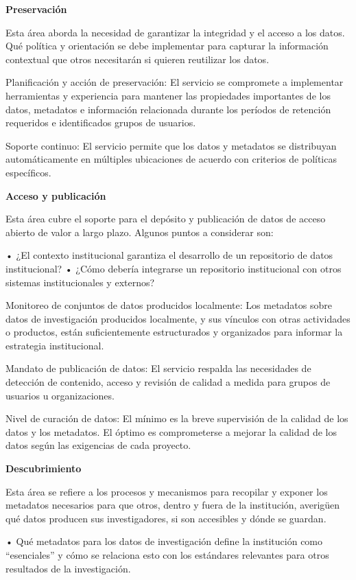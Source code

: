 \documentclass[
  14pt,
]{book}
\begin{document}
\textbf{Preservación}

Esta área aborda la necesidad de garantizar la integridad y el acceso a los datos. Qué política y orientación se debe implementar para capturar la información contextual que otros necesitarán si quieren reutilizar los datos.

Planificación y acción de preservación: El servicio se compromete a implementar herramientas y experiencia para mantener las propiedades importantes de los datos, metadatos e información relacionada durante los períodos de retención requeridos e identificados grupos de usuarios.

Soporte continuo: El servicio permite que los datos y metadatos se distribuyan automáticamente en múltiples ubicaciones de acuerdo con criterios de políticas específicos.

\textbf{Acceso y publicación}

Esta área cubre el soporte para el depósito y publicación de datos de acceso abierto de valor a largo plazo. Algunos puntos a considerar son:

• ¿El contexto institucional garantiza el desarrollo de un repositorio de datos institucional?
• ¿Cómo debería integrarse un repositorio institucional con otros sistemas institucionales y externos?

Monitoreo de conjuntos de datos producidos localmente: Los metadatos sobre datos de investigación producidos localmente, y sus vínculos con otras actividades o productos, están suficientemente estructurados y organizados para informar la estrategia institucional.

Mandato de publicación de datos: El servicio respalda las necesidades de detección de contenido, acceso y revisión de calidad a medida para grupos de usuarios u organizaciones.

Nivel de curación de datos: El mínimo es la breve supervisión de la calidad de los datos y los metadatos. El óptimo es comprometerse a mejorar la calidad de los datos según las exigencias de cada proyecto.

\textbf{Descubrimiento}

Esta área se refiere a los procesos y mecanismos para recopilar y exponer los metadatos necesarios para que otros, dentro y fuera de la institución, averigüen qué datos producen sus investigadores, si son accesibles y dónde se guardan.

• Qué metadatos para los datos de investigación define la institución como ``esenciales'' y cómo se relaciona esto con los estándares relevantes para otros resultados de la investigación.
\end{document}
